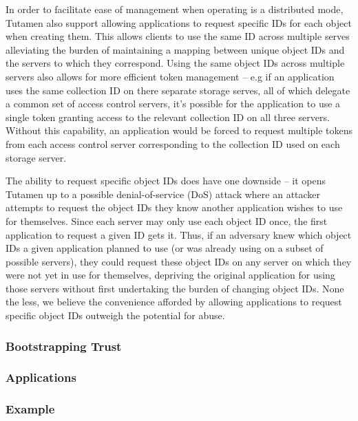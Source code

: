 In order to facilitate ease of management when operating is a
distributed mode, Tutamen also support allowing applications to
request specific IDs for each object when creating them. This allows
clients to use the same ID across multiple serves alleviating the
burden of maintaining a mapping between unique object IDs and the
servers to which they correspond. Using the same object IDs across
multiple servers also allows for more efficient token management --
e.g if an application uses the same collection ID on there separate
storage serves, all of which delegate a common set of access control
servers, it's possible for the application to use a single token
granting access to the relevant collection ID on all three
servers. Without this capability, an application would be forced to
request multiple tokens from each access control server corresponding
to the collection ID used on each storage server.

The ability to request specific object IDs does have one downside --
it opens Tutamen up to a possible denial-of-service (DoS) attack where
an attacker attempts to request the object IDs they know another
application wishes to use for themselves. Since each server may only
use each object ID once, the first application to request a given ID
gets it. Thus, if an adversary knew which object IDs a given
application planned to use (or was already using on a subset of
possible servers), they could request these object IDs on any server
on which they were not yet in use for themselves, depriving the
original application for using those servers without first undertaking
the burden of changing object IDs. None the less, we believe the
convenience afforded by allowing applications to request specific
object IDs outweigh the potential for abuse.


\subsubsection{Bootstrapping Trust}

\subsubsection{Applications}


\subsubsection{Example}


